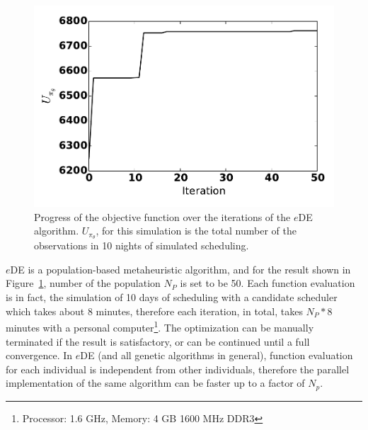 \documentclass[11pt]{article}
\theoremstyle{definition}
\begin{document}
\begin{figure}[h!]
\begin{center}
\includegraphics[width=0.4\linewidth]{Figures/eDEObjectiveFunction.pdf}
\caption{Progress of the objective function over the iterations of the $e$DE algorithm. $U_{\pi_{\theta}}$, for this simulation is the total number of the observations in 10 nights of simulated scheduling.}
\label{fig_eDEObjectiveFunction}
\end{center}
\end{figure}
$e$DE is a population-based metaheuristic algorithm, and for the result shown in Figure~\ref{fig_eDEObjectiveFunction}, number of the population $N_P$ is set to be 50. Each function evaluation is in fact, the simulation of 10 days of scheduling with a candidate scheduler which takes about 8 minutes, therefore each iteration, in total, takes $N_P * 8$ minutes with a personal computer\footnote{Processor: 1.6 GHz, Memory: 4 GB 1600 MHz DDR3}. The optimization can be manually terminated if the result is satisfactory, or can be continued until a full convergence. In $e$DE (and all genetic algorithms in general), function evaluation for each individual is independent from other individuals, therefore the parallel implementation of the same algorithm can be faster up to a factor of $N_p$. 
\end{document}
